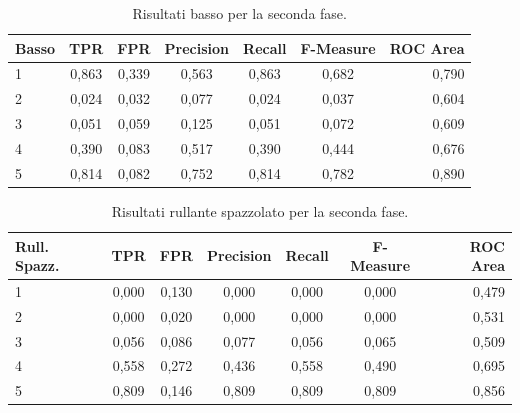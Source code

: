 \begin{table}[h!]
	\begin{center}
		\begin{tabular}{l|c|c|c|c|c|r} %
			\textbf{Basso} & \textbf{TPR} & \textbf{FPR} & \textbf{Precision} & \textbf{Recall} & \textbf{F-Measure} & \textbf{ROC Area}\\
			\hline
			1 & 0,863 & 0,339 & 0,563 & 0,863 & 0,682 & 0,790 \\
			2 & 0,024 & 0,032 & 0,077 & 0,024 & 0,037 & 0,604 \\
			3 & 0,051 & 0,059 & 0,125 & 0,051 & 0,072 & 0,609 \\
			4 & 0,390 & 0,083 & 0,517 & 0,390 & 0,444 & 0,676 \\
			5 & 0,814 & 0,082 & 0,752 & 0,814 & 0,782 & 0,890
		\end{tabular}
		\caption{Risultati basso per la seconda fase.}
		\label{tab:cb_res_2}
	\end{center}
\end{table}

\begin{table}[h!]
	\begin{center}
		\begin{tabular}{l|c|c|c|c|c|r} %
			\textbf{Rull. Spazz.} & \textbf{TPR} & \textbf{FPR} & \textbf{Precision} & \textbf{Recall} & \textbf{F-Measure} & \textbf{ROC Area}\\
			\hline
			1 & 0,000 & 0,130 & 0,000 & 0,000 & 0,000 & 0,479 \\
			2 & 0,000 & 0,020 & 0,000 & 0,000 & 0,000 & 0,531 \\
			3 & 0,056 & 0,086 & 0,077 & 0,056 & 0,065 & 0,509 \\
			4 & 0,558 & 0,272 & 0,436 & 0,558 & 0,490 & 0,695 \\
			5 & 0,809 & 0,146 & 0,809 & 0,809 & 0,809 & 0,856 \\
		\end{tabular}
		\caption{Risultati rullante spazzolato per la seconda fase.}
		\label{tab:sn_brush_res_2}
	\end{center}
\end{table}

